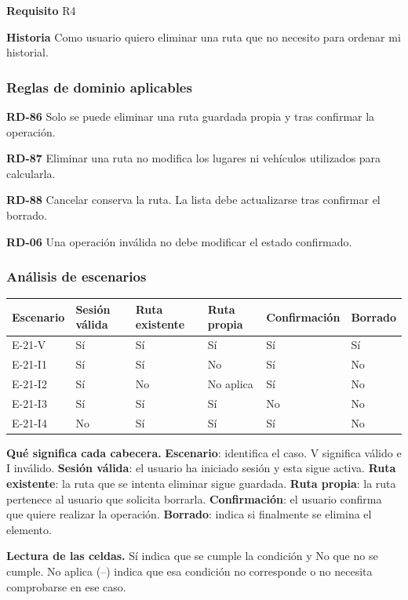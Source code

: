\textbf{Requisito} R4\par

\textbf{Historia} Como usuario quiero eliminar una ruta que no necesito para ordenar mi historial.\par

\subsubsection*{Reglas de dominio aplicables}

\textbf{RD-86} Solo se puede eliminar una ruta guardada propia y tras confirmar la operación.\par

\textbf{RD-87} Eliminar una ruta no modifica los lugares ni vehículos utilizados para calcularla.\par

\textbf{RD-88} Cancelar conserva la ruta. La lista debe actualizarse tras confirmar el borrado.\par

\textbf{RD-06} Una operación inválida no debe modificar el estado confirmado.\par

\subsubsection*{Análisis de escenarios}

\begingroup\fontsize{7.8}{11}\selectfont\setlength{\tabcolsep}{3pt}
\begin{tabularx}{\linewidth}{@{}*{6}{Y}@{}}\toprule
\textbf{Escenario} & \textbf{Sesión válida} & \textbf{Ruta existente} & \textbf{Ruta propia} & \textbf{Confirmación} & \textbf{Borrado}\\\midrule
E-21-V & Sí & Sí & Sí & Sí & Sí\\[3pt]
E-21-I1 & Sí & Sí & No & Sí & No\\[3pt]
E-21-I2 & Sí & No & No aplica & Sí & No\\[3pt]
E-21-I3 & Sí & Sí & Sí & No & No\\[3pt]
E-21-I4 & No & Sí & Sí & Sí & No\\[3pt]
\bottomrule\end{tabularx}\endgroup\par
{\fontsize{9}{11}\selectfont\textbf{Qué significa cada cabecera.} \textbf{Escenario}: identifica el caso. V significa válido e I inválido. \textbf{Sesión válida}: el usuario ha iniciado sesión y esta sigue activa. \textbf{Ruta existente}: la ruta que se intenta eliminar sigue guardada. \textbf{Ruta propia}: la ruta pertenece al usuario que solicita borrarla. \textbf{Confirmación}: el usuario confirma que quiere realizar la operación. \textbf{Borrado}: indica si finalmente se elimina el elemento.\par\textbf{Lectura de las celdas.} Sí indica que se cumple la condición y No que no se cumple. No aplica (--) indica que esa condición no corresponde o no necesita comprobarse en ese caso.\par}


